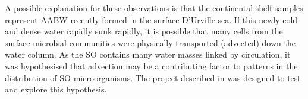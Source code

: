 

A possible explanation for these observations is that the continental shelf samples represent \ac{AABW} recently formed in the surface D'Urville sea.
If this newly cold and dense water rapidly sunk rapidly, it is possible that many cells from the surface microbial communities were physically transported (advected) down the water column.
As the \ac{SO} contains many water masses linked by circulation, it was hypothesised that advection may be a contributing factor to patterns in the distribution of \ac{SO} microorganisms.
The project described in  was designed to test and explore this hypothesis.



